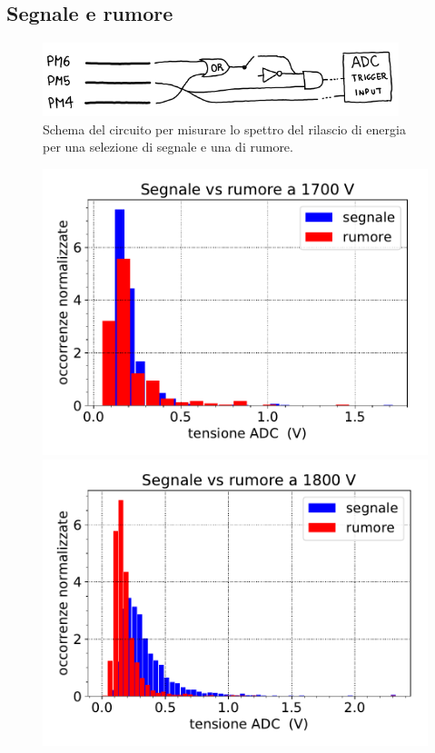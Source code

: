 
\subsection{Segnale e rumore}
\label{cenno}

\begin{figure}
	\centering
	\includegraphics[width=28em]{anti_prov}
	\caption{Schema del circuito per misurare lo spettro del rilascio di energia
	per una selezione di segnale e una di rumore.}
	\label{anti_prov}
\end{figure}

\begin{figure}
	\hspace{-2cm}
	{\includegraphics[width=8 cm]{1700}}
	\qquad
	{\includegraphics[width=8 cm]{1800}} 


\end{figure}
